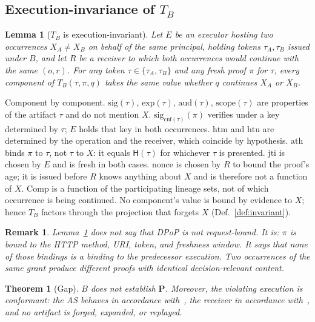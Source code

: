 \documentclass[conference]{IEEEtran}
\newcommand{\scope}{\mathrm{scope}}
\newcommand{\aud}{\mathrm{aud}}
\newcommand{\Comp}{\mathrm{Comp}}
\newcommand{\Hsh}{\mathsf{H}}
\newtheorem{lemma}{Lemma}
\newtheorem{theorem}{Theorem}
\newtheorem{remark}{Remark}
\begin{document}
\subsection{Execution-invariance of $T_B$}

\begin{lemma}[$T_B$ is execution-invariant]\label{lem:invariance}
Let $E$ be an executor hosting two occurrences $X_A\neq X_B$ on behalf of the same principal, holding tokens $\tau_A,\tau_B$ issued under $B$, and let $R$ be a receiver to which both occurrences would continue with the same $(o,r)$. For any token $\tau\in\{\tau_A,\tau_B\}$ and any fresh proof $\pi$ for $\tau$, every component of $T_B(\tau,\pi,q)$ takes the same value whether $q$ continues $X_A$ or $X_B$.
\end{lemma}

\begin{IEEEproof}
Component by component. $\mathrm{sig}(\tau)$, $\mathrm{exp}(\tau)$, $\aud(\tau)$, $\scope(\tau)$ are properties of the artifact $\tau$ and do not mention $X$. $\mathrm{sig}_{\mathrm{cnf}(\tau)}(\pi)$ verifies under a key determined by $\tau$; $E$ holds that key in both occurrences. $\mathrm{htm}$ and $\mathrm{htu}$ are determined by the operation and the receiver, which coincide by hypothesis. $\mathrm{ath}$ binds $\pi$ to $\tau$, not $\tau$ to $X$: it equals $\Hsh(\tau)$ for whichever $\tau$ is presented. $\mathrm{jti}$ is chosen by $E$ and is fresh in both cases. $\mathrm{nonce}$ is chosen by $R$ to bound the proof's age; it is issued before $R$ knows anything about $X$ and is therefore not a function of $X$. $\Comp$ is a function of the participating lineage sets, not of which occurrence is being continued. No component's value is bound by evidence to $X$; hence $T_B$ factors through the projection that forgets $X$ (Def.~\ref{def:invariant}).
\end{IEEEproof}

\begin{remark}
Lemma~\ref{lem:invariance} does not say that DPoP is not request-bound. It is: $\pi$ is bound to the HTTP method, URI, token, and freshness window. It says that none of those bindings is a binding to the \emph{predecessor execution}. Two occurrences of the same grant produce different proofs with identical decision-relevant content.
\end{remark}

\begin{theorem}[Gap]\label{thm:gap}
$B$ does not establish $\mathbf{P}$. Moreover, the violating execution is conformant: the AS behaves in accordance with~\cite{rfc6749,rfc8693}, the receiver in accordance with~\cite{rfc6750,rfc9449}, and no artifact is forged, expanded, or replayed.
\end{theorem}
\end{document}
